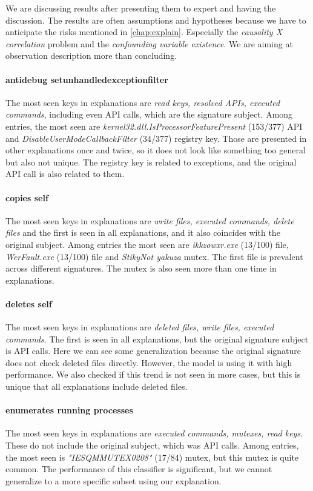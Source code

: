 We are discussing results after presenting them to expert and having the discussion. The results are often assumptions and hypotheses because we have to anticipate the risks mentioned in \ref{chap:explain}. Especially the \emph{causality X correlation} problem and the \emph{confounding variable existence}. We are aiming at observation description more than concluding.

\paragraph{antidebug setunhandledexceptionfilter}
The most seen keys in explanations are \emph{read keys, resolved APIs, executed commands}, including even API calls, which are the signature subject. Among entries, the most seen are \emph{kernel32.dll.IsProcessorFeaturePresent} (153/377) API and \emph{DisableUserModeCallbackFilter} (34/377) registry key. Those are presented in other explanations once and twice, so it does not look like something too general but also not unique. The registry key is related to exceptions, and the original API call is also related to them.

\paragraph{copies self}
The most seen keys in explanations are \emph{write files, executed commands, delete files} and the first is seen in all explanations, and it also coincides with the original subject. Among entries the most seen are \emph{ikkzowxr.exe} (13/100) file, \emph{WerFault.exe} (13/100) file and \emph{StikyNot yakuza} mutex. The first file is prevalent across different signatures. The mutex is also seen more than one time in explanations.

\paragraph{deletes self}
The most seen keys in explanations are \emph{deleted files, write files, executed commands}. The first is seen in all explanations, but the original signature subject is API calls. Here we can see some generalization because the original signature does not check deleted files directly. However, the model is using it with high performance. We also checked if this trend is not seen in more cases, but this is unique that all explanations include deleted files.

\paragraph{enumerates running processes}
The most seen keys in explanations are \emph{executed commands, mutexes, read keys}. These do not include the original subject, which was API calls.  Among entries, the most seen is \emph{"IESQMMUTEX0208"} (17/84) mutex, but this mutex is quite common. The performance of this classifier is significant, but we cannot generalize to a more specific subset using our explanation.

